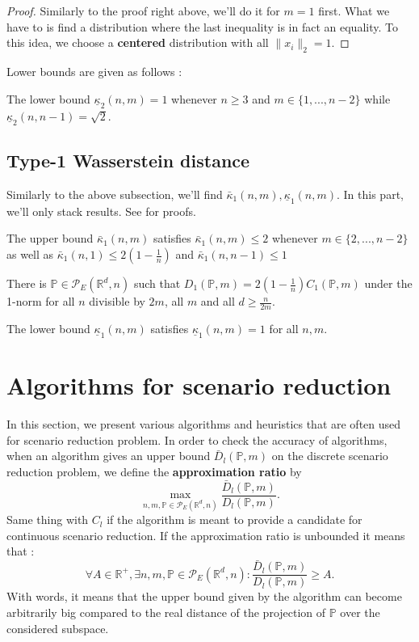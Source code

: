 \documentclass{amsart}
\newcommand{\RR}{\mathbb{R}}
\begin{document}
\begin{proof}
    Similarly to the proof right above, we'll do it for $m=1$ first. What we have to is find a distribution where the last inequality is in fact an equality. To this idea, we choose a \textbf{centered} distribution with all $\lVert x_i\rVert_2=1$.
\end{proof}
Lower bounds are given as follows : 
\begin{proposition}
    The lower bound $\underline\kappa_2\left(n,m\right)=1$ whenever $n\geq3$ and $m\in\{1,...,n-2\}$ while $\underline\kappa_2\left(n,n-1\right)=\sqrt{2}.$
\end{proposition}
\subsection{Type-1 Wasserstein distance}
Similarly to the above subsection, we'll find $\bar{\kappa}_1\left(n,m\right), \underline\kappa_1\left(n,m\right)$. In this part, we'll only stack results. See \cite[Section 3.2]{rujeerapaiboon_scenario_2022} for proofs.
\begin{theorem}
    The upper bound $\bar\kappa_1\left(n,m\right)$ satisfies $\bar\kappa_1\left(n,m\right)\leq2$ whenever $m\in\{2,...,n-2\}$ as well as $\bar\kappa_1\left(n,1\right)\leq2\left(1-\frac{1}{n}\right)$ and $\bar\kappa_1\left(n,n-1\right)\leq1$
\end{theorem}
\begin{proposition}
    There is $\mathbb{P}\in\mathcal{P}_E\left(\RR^d,n\right)$ such that $D_1\left(\mathbb{P},m\right)=2\left(1-\frac{1}{n}\right)C_1\left(\mathbb{P},m\right)$ under the 1-norm for all $n$ divisible by $2m$, all $m$ and all $d\geq \frac{n}{2m}$.
\end{proposition}
\begin{proposition}
    The lower bound $\underline{\kappa}_1\left(n,m\right)$ satisfies $\underline{\kappa}_1\left(n,m\right)=1$ for all $n, m$.
\end{proposition}

\section{Algorithms for scenario reduction}
In this section, we present various algorithms and heuristics that are often used for scenario reduction problem. In order to check the accuracy of algorithms, when an algorithm gives an upper bound $\bar{D}_l\left(\mathbb{P},m\right)$ on the discrete scenario reduction problem, we define the \textbf{approximation ratio} by 
$$
\max_{n,m,\mathbb{P}\in\mathcal{P}_E(\RR^d,n)}\frac{\bar{D}_l\left(\mathbb{P},m\right)}{D_l\left(\mathbb{P},m\right)}.
$$
Same thing with $C_l$ if the algorithm is meant to provide a candidate for continuous scenario reduction. If the approximation ratio is unbounded it means that :
$$\forall A\in\RR^+, \exists n,m,\mathbb{P}\in\mathcal{P}_E\left(\RR^d,n\right) : \frac{\bar{D}_l\left(\mathbb{P},m\right)}{D_l\left(\mathbb{P},m\right)}\geq A.$$
With words, it means that the upper bound given by the algorithm can become arbitrarily big compared to the real distance of the projection of $\mathbb{P}$ over the considered subspace.
\end{document}
